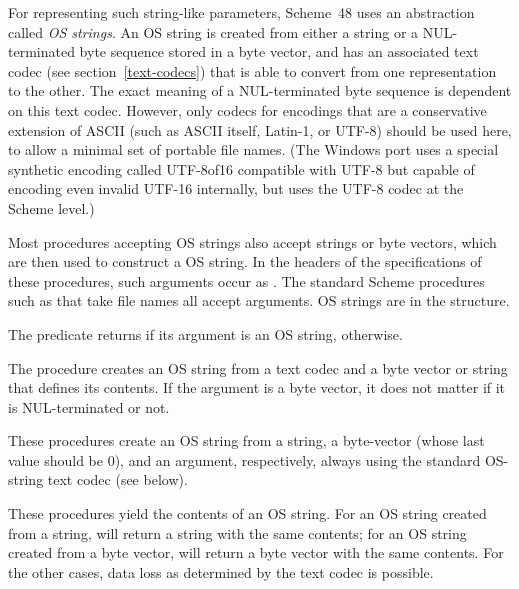 For representing such string-like parameters, Scheme~48 uses an
abstraction called \textit{OS strings}.  An OS string is created from
either a string or a NUL-terminated byte sequence stored in a byte
vector, and has an associated text codec (see
section~\ref{text-codecs}) that is able to convert from one
representation to the other.  The exact meaning of a NUL-terminated
byte sequence is dependent on this text codec.  However, only codecs
for encodings that are a conservative extension of ASCII (such as
ASCII itself, Latin-1, or UTF-8) should be used here, to allow a
minimal set of portable file names.  (The Windows port uses a special
synthetic encoding called UTF-8of16 compatible with UTF-8 but capable
of encoding even invalid UTF-16 internally, but uses the UTF-8 codec
at the Scheme level.)

Most procedures accepting OS strings also accept strings or byte
vectors, which are then used to construct a OS string.  In the headers
of the specifications of these procedures, such arguments occur as
.
The standard Scheme procedures such as  that
take file names all accept  arguments.  OS
strings are in the  structure.

\begin{protos}
\end{protos}
%
The  predicate returns  if its argument is
an OS string,  otherwise.

The  procedure creates an OS string from a text
codec and a byte vector or string that defines its contents.  If the
argument is a byte vector, it does not matter if it is NUL-terminated
or not.

\begin{protos}
\end{protos}
\noindent
These procedures create an OS string from a string, a byte-vector
(whose last value should be 0), and an  argument,
respectively, always using the standard OS-string text codec (see
below).

\begin{protos}
\end{protos}
\noindent
These procedures yield the contents of an OS string.  For an OS string
created from a string,  will return a string
with the same contents; for an OS string created from a byte vector,
 will return a byte vector with the same
contents.  For the other cases, data loss as determined by the text
codec is possible.


